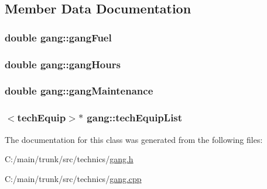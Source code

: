 \subsection{Member Data Documentation}
\hypertarget{classgang_a194b6fd27c1716b1937270669a7957d3}{
\subsubsection[{gangFuel}]{\setlength{\rightskip}{0pt plus 5cm}double {\bf gang::gangFuel}}}
\label{classgang_a194b6fd27c1716b1937270669a7957d3}
\hypertarget{classgang_aa4dcaa4f57f2795993a4d9b4257733c4}{
\subsubsection[{gangHours}]{\setlength{\rightskip}{0pt plus 5cm}double {\bf gang::gangHours}}}
\label{classgang_aa4dcaa4f57f2795993a4d9b4257733c4}
\hypertarget{classgang_a1b89302ca15faa1cb6d1a281ba3792cc}{
\subsubsection[{gangMaintenance}]{\setlength{\rightskip}{0pt plus 5cm}double {\bf gang::gangMaintenance}}}
\label{classgang_a1b89302ca15faa1cb6d1a281ba3792cc}
\hypertarget{classgang_a42b0369cb27b2979e0f038e85339b8b8}{
\subsubsection[{techEquipList}]{$<${\bf techEquip}$>$$\ast$ {\bf gang::techEquipList}}}
\label{classgang_a42b0369cb27b2979e0f038e85339b8b8}


The documentation for this class was generated from the following files:\begin{DoxyCompactItemize}
\item 
C:/main/trunk/src/technics/\hyperlink{gang_8h}{gang.h}\item 
C:/main/trunk/src/technics/\hyperlink{gang_8cpp}{gang.cpp}\end{DoxyCompactItemize}
